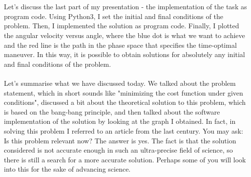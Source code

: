 \documentclass[12pt,a4paper, titlepage]{article}
\begin{document}
\\
\\
Let's discuss the last part of my presentation - the implementation of the task as program code. Using Python3, I set the initial and final conditions of the problem. Then, I implemented the solution as program code. Finally, I plotted the angular velocity versus angle, where the blue dot is what we want to achieve and the red line is the path in the phase space that specifies the time-optimal maneuver. In this way, it is possible to obtain solutions for absolutely any initial and final conditions of the problem.
\\
\\
Let's summarise what we have discussed today. We talked about the problem statement, which in short sounds like "minimizing the cost function under given conditions", discussed a bit about the theoretical solution to this problem, which is based on the bang-bang principle, and then talked about the software implementation of the solution by looking at the graph I obtained. In fact, in solving this problem I referred to an article from the last century. You may ask: Is this problem relevant now? The answer is yes. The fact is that the solution considered is not accurate enough in such an ultra-precise field of science, so there is still a search for a more accurate solution. Perhaps some of you will look into this for the sake of advancing science.
\end{document}
